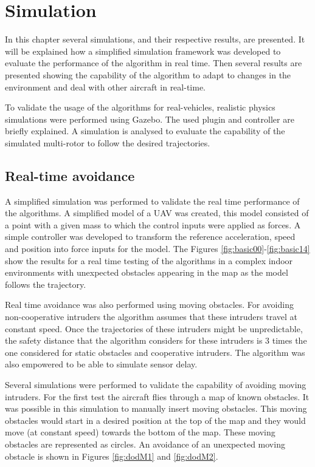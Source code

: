 \section{Simulation}
In this chapter several simulations, and their respective results, are presented. It will be explained how a simplified simulation framework was developed to evaluate the performance of the algorithm in real time. Then several results are presented showing the capability of the algorithm to adapt to changes in the environment and deal with other aircraft in real-time.
\par
To validate the usage of the algorithms for real-vehicles, realistic physics simulations were performed using Gazebo. The used plugin and controller are briefly explained. A simulation is analysed to evaluate the capability of the simulated multi-rotor to follow the desired trajectories.

\subsection{Real-time avoidance}
A simplified simulation was performed to validate the real time performance of the algorithms. A simplified model of a UAV was created, this model consisted of a point with a given mass to which the control inputs were applied as forces. A simple controller was developed to transform the reference acceleration, speed and position into force inputs for the model.
The Figures \ref{fig:basic00}-\ref{fig:basic14} show the results for a real time testing of the algorithms in a complex indoor environments with unexpected obstacles appearing in the map as the model follows the trajectory.



Real time avoidance was also performed using moving obstacles. For avoiding non-cooperative intruders the algorithm assumes that these intruders travel at constant speed. Once the trajectories of these intruders might be unpredictable, the safety distance that the algorithm considers for these intruders is 3 times the one considered for static obstacles and cooperative intruders. The algorithm was also empowered to be able to simulate sensor delay.
\par
Several simulations were performed to validate the capability of avoiding moving intruders. For the first test the aircraft flies through a map of known obstacles. It was possible in this simulation to manually insert moving obstacles. This moving obstacles would start in a desired position at the top of the map and they would move (at constant speed) towards the bottom of the map. These moving obstacles are represented as circles. An avoidance of an unexpected moving obstacle is shown in Figures \ref{fig:dodM1} and \ref{fig:dodM2}.

